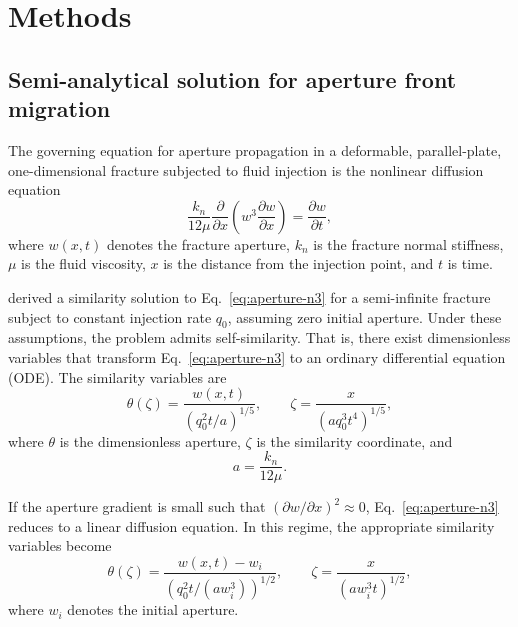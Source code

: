 \documentclass[draft]{agujournal2019}
\begin{document}
\section{Methods}

\subsection{Semi-analytical solution for aperture front migration}

The governing equation for aperture propagation in a deformable, parallel-plate, one-dimensional fracture subjected to fluid injection is the nonlinear diffusion equation \cite{MurphyEtAl2004}
\begin{equation}
	\frac{k_n}{12 \mu} \frac{\partial}{\partial x}\left(w^3 \frac{\partial w}{\partial x}\right)
	= \frac{\partial w}{\partial t},
	\label{eq:aperture-n3}
\end{equation}
where $w(x,t)$ denotes the fracture aperture, $k_n$ is the fracture normal stiffness, $\mu$ is the fluid viscosity, $x$ is the distance from the injection point, and $t$ is time.

 derived a similarity solution to Eq.~\ref{eq:aperture-n3} for a semi-infinite fracture subject to constant injection rate $q_0$, assuming zero initial aperture. Under these assumptions, the problem admits self-similarity. That is, there exist dimensionless variables that transform Eq.~\ref{eq:aperture-n3} to an ordinary differential equation (ODE). The similarity variables are
\begin{equation}
	\theta(\zeta) = \frac{w(x,t)}{(q_0^2 t / a)^{1/5}},
	\qquad
	\zeta = \frac{x}{(a q_0^3 t^4)^{1/5}},
	\label{eq:dimensionless-variables-n3}
\end{equation}
where $\theta$ is the dimensionless aperture, $\zeta$ is the similarity coordinate, and
\[
	a = \frac{k_n}{12\mu}.
\]

If the aperture gradient is small such that $\left(\partial w / \partial x\right)^2 \approx 0$, Eq.~\ref{eq:aperture-n3} reduces to a linear diffusion equation. In this regime, the appropriate similarity variables become
\begin{equation}
	\theta(\zeta) =
	\frac{w(x,t)-w_i}{\left(q_0^2 t / (a w_i^3)\right)^{1/2}},
	\qquad
	\zeta = \frac{x}{(a w_i^3 t)^{1/2}},
	\label{eq:dimensionless-variables-n0}
\end{equation}
where $w_i$ denotes the initial aperture.
\end{document}
